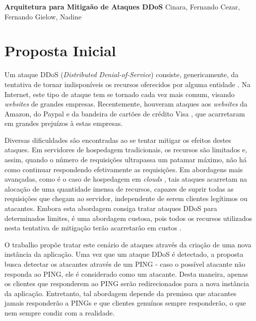 \documentclass[a4paper, 11pt]{article}
\begin{document}
{
\begin{center}
{\LARGE \textbf{Arquitetura para Mitiga\cc\~ao de Ataques DDoS}}
\vskip 0.5cm
{\Large Cinara, Fernando Cezar, Fernando Gielow, Nadine}
\end{center}
}

\section{Proposta Inicial}

Um ataque DDoS (\emph{Distributed Denial-of-Service})
 consiste, genericamente, da tentativa de tornar indisponíveis
os recursos oferecidos por alguma entidade \cite{Zhang:11}. Na Internet, este
tipo de ataque tem se tornado cada vez mais comum, visando \emph{websites} de
grandes empresas. Recentemente, houveram ataques aos \emph{websites} da Amazon,
do Paypal e da bandeira de cartões de crédito Visa \cite{Zuckerman:10}, que
acarretaram em grandes prejuízos à estas empresas.

Diversas dificuldades são encontradas ao se tentar mitigar os efeitos destes
ataques. Em servidores de hospedagem tradicionais, os recursos são limitados e,
assim, quando o número de requisições ultrapassa um patamar máximo, não há como
continuar respondendo efetivamente as requisições. Em abordagens mais avançadas,
como é o caso de hospedagem em \emph{clouds} \cite{Zhang:10}, tais ataques
acarretam na alocação de uma quantidade imensa de recursos, capazes de
suprir todas as requisições que chegam ao servidor, independente de serem
clientes legítimos ou atacantes. Embora esta abordagem consiga tratar ataques
DDoS para determinados limites, é uma abordagem custosa, pois todos os recursos
utilizados nesta tentativa de mitigação ter\~ao acarretar\~ao em custos
\cite{Soon:10}.

O trabalho \cite{Bakshi:10} prop\~oe tratar este cen\'ario de ataques através da
criação de uma nova instância da aplicação. Uma vez que um ataque DDoS é
detectado, a proposta busca detectar os atacantes através de um PING -
caso o possível atacante não responda ao PING, ele é considerado como um
atacante. Desta maneira, apenas os clientes que responderem ao PING serão
redirecionados para a nova instância da aplicação. Entretanto, tal abordagem
depende da premissa que atacantes jamais responderão a PINGs e que clientes
genuínos sempre responderão, o que nem sempre condiz com a realidade. 
\end{document}

